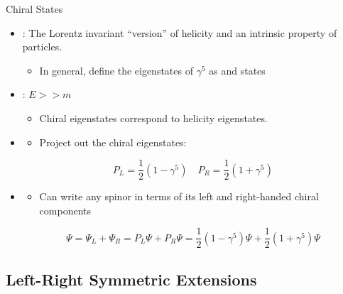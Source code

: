 \documentclass[aspectratio=169]{beamer}
\begin{document}
\begin{frame}{Chiral States}
  \begin{itemize}
    \item {}: The Lorentz invariant ``version'' of helicity and an intrinsic property of particles.
      \begin{itemize}
        \item In general, define the eigenstates of $\gamma^{5}$ as  and  states
      \end{itemize}
    \item {}:
      $E >> m$
      \begin{itemize}
        \item Chiral eigenstates correspond to helicity eigenstates.
      \end{itemize}
    \item {}
      \begin{itemize}
        \item Project out the chiral eigenstates:
      \end{itemize}
      $$
        \boxed{P_{L} = \frac{1}{2}\left(1 - \gamma^{5}\right) \quad P_{R} = \frac{1}{2}\left(1 + \gamma^{5}\right)}
      $$
    \item {}
      \begin{itemize}
        \item Can write any spinor in terms of its left and right-handed chiral components
      \end{itemize}
      $$
        \Psi = \Psi_{L} + \Psi_{R} = P_{L}\Psi + P_{R}\Psi = \frac{1}{2}\left(1 - \gamma^{5}\right)\Psi + \frac{1}{2}\left(1 + \gamma^{5}\right)\Psi
      $$
  \end{itemize}
\end{frame}

\subsection{Left-Right Symmetric Extensions}
\end{document}
